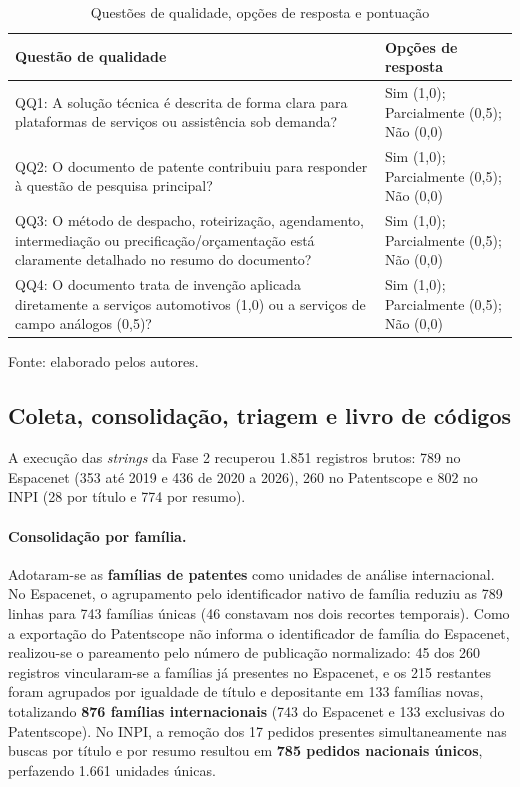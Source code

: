 \documentclass[12pt,a4paper]{article}
\begin{document}
\begin{table}[htbp]
\centering\small
\caption{Questões de qualidade, opções de resposta e pontuação}\label{tab:qq}
\begin{tabular}{p{9.0cm}p{4.2cm}}
\toprule
\textbf{Questão de qualidade} & \textbf{Opções de resposta}\\
\midrule
QQ1: A solução técnica é descrita de forma clara para plataformas de serviços ou assistência sob demanda? & Sim (1,0); Parcialmente (0,5); Não (0,0)\\
QQ2: O documento de patente contribuiu para responder à questão de pesquisa principal? & Sim (1,0); Parcialmente (0,5); Não (0,0)\\
QQ3: O método de despacho, roteirização, agendamento, intermediação ou precificação/orçamentação está claramente detalhado no resumo do documento? & Sim (1,0); Parcialmente (0,5); Não (0,0)\\
QQ4: O documento trata de invenção aplicada diretamente a serviços automotivos (1,0) ou a serviços de campo análogos (0,5)? & Sim (1,0); Parcialmente (0,5); Não (0,0)\\
\bottomrule
\end{tabular}

\smallskip
\footnotesize Fonte: elaborado pelos autores.
\end{table}

\subsection{Coleta, consolidação, triagem e livro de códigos}

A execução das \textit{strings} da Fase 2 recuperou 1.851 registros brutos: 789 no Espacenet (353 até 2019 e 436 de 2020 a 2026), 260 no Patentscope e 802 no INPI (28 por título e 774 por resumo).

\paragraph{Consolidação por família.} Adotaram-se as \textbf{famílias de patentes} como unidades de análise internacional. No Espacenet, o agrupamento pelo identificador nativo de família reduziu as 789 linhas para 743 famílias únicas (46 constavam nos dois recortes temporais). Como a exportação do Patentscope não informa o identificador de família do Espacenet, realizou-se o pareamento pelo número de publicação normalizado: 45 dos 260 registros vincularam-se a famílias já presentes no Espacenet, e os 215 restantes foram agrupados por igualdade de título e depositante em 133 famílias novas, totalizando \textbf{876 famílias internacionais} (743 do Espacenet e 133 exclusivas do Patentscope). No INPI, a remoção dos 17 pedidos presentes simultaneamente nas buscas por título e por resumo resultou em \textbf{785 pedidos nacionais únicos}, perfazendo 1.661 unidades únicas.
\end{document}
